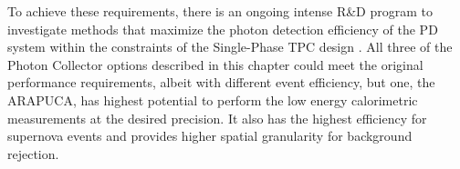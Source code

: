 To achieve these requirements, there is an ongoing intense R\&D program to investigate methods that maximize the photon detection efficiency of the PD system within the constraints of the Single-Phase TPC design .  All three of the Photon Collector options described in this chapter could meet the original performance requirements, albeit with different event efficiency, but one, the ARAPUCA, has highest potential to perform the low energy calorimetric measurements at the desired precision. It also has the highest efficiency for supernova events and provides higher spatial granularity for background rejection. 





